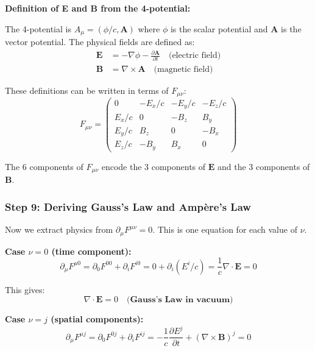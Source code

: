 \textbf{Definition of E and B from the 4-potential:}

The 4-potential is $A_\mu = (\phi/c, \mathbf{A})$ where $\phi$ is the scalar potential and $\mathbf{A}$ is the vector potential. The physical fields are defined as:
\begin{align}
\mathbf{E} &= -\nabla\phi - \frac{\partial \mathbf{A}}{\partial t} \quad \text{(electric field)}\\
\mathbf{B} &= \nabla \times \mathbf{A} \quad \text{(magnetic field)}
\end{align}

These definitions can be written in terms of $F_{\mu\nu}$:
\begin{equation}
F_{\mu\nu} = \begin{pmatrix}
0 & -E_x/c & -E_y/c & -E_z/c \\
E_x/c & 0 & -B_z & B_y \\
E_y/c & B_z & 0 & -B_x \\
E_z/c & -B_y & B_x & 0
\end{pmatrix}
\end{equation}

The 6 components of $F_{\mu\nu}$ encode the 3 components of $\mathbf{E}$ and the 3 components of $\mathbf{B}$.

\subsubsection{Step 9: Deriving Gauss's Law and Ampère's Law}

Now we extract physics from $\partial_\mu F^{\mu\nu} = 0$. This is one equation for each value of $\nu$.

\textbf{Case $\nu = 0$ (time component):}
\begin{equation}
\partial_\mu F^{\mu 0} = \partial_0 F^{00} + \partial_i F^{i0} = 0 + \partial_i (E^i/c) = \frac{1}{c}\nabla \cdot \mathbf{E} = 0
\end{equation}

This gives:
\begin{equation}
\boxed{\nabla \cdot \mathbf{E} = 0} \quad \textbf{(Gauss's Law in vacuum)}
\end{equation}

\textbf{Case $\nu = j$ (spatial components):}
\begin{equation}
\partial_\mu F^{\mu j} = \partial_0 F^{0j} + \partial_i F^{ij} = -\frac{1}{c}\frac{\partial E^j}{\partial t} + (\nabla \times \mathbf{B})^j = 0
\end{equation}

